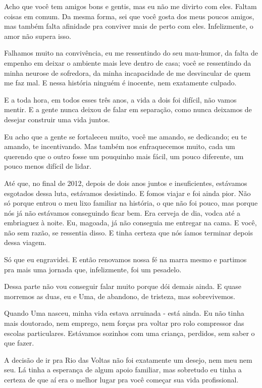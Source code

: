 Acho que você tem amigos bons e gentis, mas eu não me divirto com eles.
Faltam coisas em comum. Da mesma forma, sei que você gosta dos meus
poucos amigos, mas também falta afinidade pra conviver mais de perto com
eles. Infelizmente, o amor não supera isso.

Falhamos muito na convivência, eu me ressentindo do seu mau-humor, da
falta de empenho em deixar o ambiente mais leve dentro de casa; você se
ressentindo da minha neurose de sofredora, da minha incapacidade de me
desvincular de quem me faz mal. E nessa história ninguém é inocente, nem
exatamente culpado.

E a toda hora, em todos esses três anos, a vida a dois foi difícil, não
vamos mentir. E a gente nunca deixou de falar em separação, como nunca
deixamos de desejar construir uma vida juntos.

Eu acho que a gente se fortaleceu muito, você me amando, se dedicando;
eu te amando, te incentivando. Mas também nos enfraquecemos muito, cada
um querendo que o outro fosse um pouquinho mais fácil, um pouco
diferente, um pouco menos difícil de lidar.

Até que, no final de 2012, depois de dois anos juntos e insuficientes,
estávamos esgotados dessa luta, estávamos desistindo. E fomos viajar e
foi ainda pior. Não só porque entrou o meu lixo familiar na história, o
que não foi pouco, mas porque nós já não estávamos conseguindo ficar
bem. Era cerveja de dia, vodca até a embriaguez à noite. Eu, magoada, já
não conseguia me entregar na cama. E você, não sem razão, se ressentia
disso. E tinha certeza que nós íamos terminar depois dessa viagem.

Só que eu engravidei. E então renovamos nossa fé na marra mesmo e
partimos pra mais uma jornada que, infelizmente, foi um pesadelo.

Dessa parte não vou conseguir falar muito porque dói demais ainda. E
quase morremos as duas, eu e Uma, de abandono, de tristeza, mas
sobrevivemos.

Quando Uma nasceu, minha vida estava arruinada - está ainda. Eu não
tinha mais doutorado, nem emprego, nem forças pra voltar pro rolo
compressor das escolas particulares. Estávamos sozinhos com uma criança,
perdidos, sem saber o que fazer.

A decisão de ir pra Rio das Voltas não foi exatamente um desejo, nem meu
nem seu. Lá tinha a esperança de algum apoio familiar, mas sobretudo eu
tinha a certeza de que aí era o melhor lugar pra você começar sua vida
profissional.

